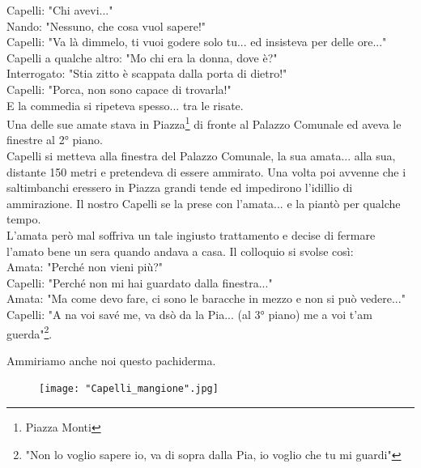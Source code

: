 \documentclass[10pt]{memoir} %
\begin{document}
Capelli: "Chi avevi..."\\
Nando: "Nessuno, che cosa vuol sapere!"\\
Capelli: "Va là dimmelo, ti vuoi godere solo tu... ed insisteva per delle ore..."\\
Capelli a qualche altro: "Mo chi era la donna, dove è?"\\
Interrogato: "Stia zitto è scappata dalla porta di dietro!"\\
Capelli: "Porca, non sono capace di trovarla!"\\
E la commedia si ripeteva spesso... tra le risate.\\
Una delle sue amate stava in Piazza\footnote{Piazza Monti} di fronte al Palazzo Comunale ed aveva le finestre al 2° piano.\\
Capelli si metteva alla finestra del Palazzo Comunale, la sua amata... alla sua, distante 150 metri e pretendeva di essere ammirato. Una volta poi avvenne che i saltimbanchi eressero in Piazza grandi tende ed impedirono l'idillio di ammirazione. Il nostro Capelli se la prese con l'amata... e la piantò per qualche tempo.\\
L'amata però mal soffriva un tale ingiusto trattamento e decise di fermare l'amato bene un sera quando andava a casa. Il colloquio si svolse così:\\
Amata: "Perché non vieni più?"\\
Capelli: "Perché non mi hai guardato dalla finestra..."\\
Amata: "Ma come devo fare, ci sono le baracche in mezzo e non si può vedere..."\\
Capelli: "A na voi savé me, va dsò da la Pia... (al 3° piano) me a voi t'am guerda"\footnote{"Non lo voglio sapere io, va di sopra dalla Pia, io voglio che tu mi guardi"}.\\
\newpage

Ammiriamo anche noi questo pachiderma.
\begin{figure}[H]
\begin{center}
\vspace{-10pt}
   \texttt{[image: "Capelli\_mangione".jpg]}\\
  \end{center}
\end{figure}
\end{document}
